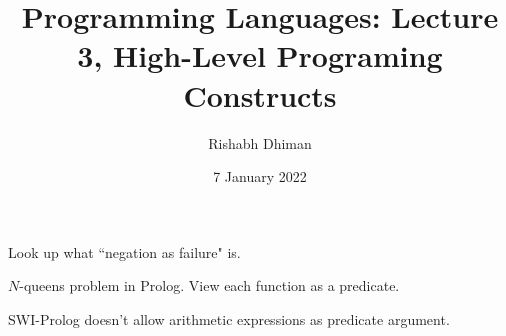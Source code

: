\documentclass[a4paper]{scrartcl}
\title{Programming Languages: Lecture 3, High-Level Programing Constructs}
\author{Rishabh Dhiman}
\date{7 January 2022}
\begin{document}
\maketitle

Look up what ``negation as failure" is.

$N$-queens problem in Prolog. View each function as a predicate.

SWI-Prolog doesn't allow arithmetic expressions as predicate argument.
\end{document}

